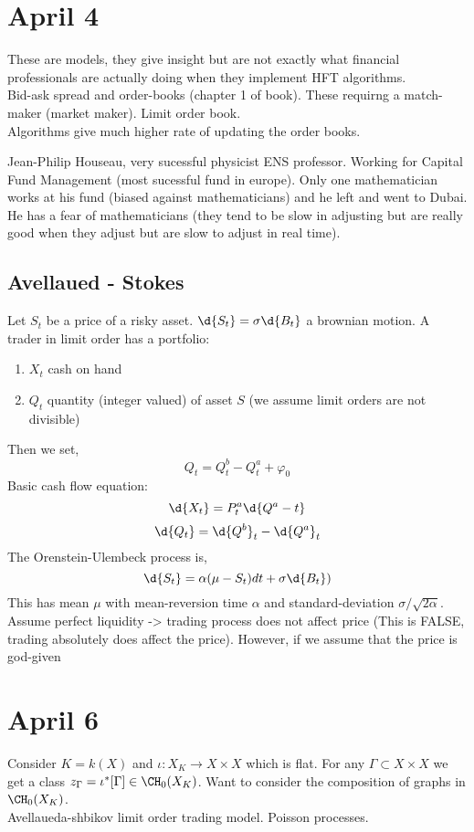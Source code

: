\documentclass[12pt]{article}
\begin{document}
\section{April 4}

These are models, they give insight but are not exactly what financial professionals are actually doing when they implement HFT algorithms.
\bigskip\\
Bid-ask spread and order-books (chapter 1 of book). These requirng a match-maker (market maker). Limit order book.
\bigskip\\
Algorithms give much higher rate of updating the order books.

Jean-Philip Houseau, very sucessful physicist ENS professor. Working for Capital Fund Management (most sucessful fund in europe). Only one mathematician works at his fund (biased against mathematicians) and he left and went to Dubai. He has a fear of mathematicians (they tend to be slow in adjusting but are really good when they adjust but are slow to adjust in real time).

\subsection{Avellaued - Stokes}

Let $S_t$ be a price of a risky asset. $\d{S_t} = \sigma \d{B_t}$ a brownian motion. A trader in limit order has a portfolio: 
\begin{enumerate}
\item $X_t$ cash on hand
\item $Q_t$ quantity (integer valued) of asset $S$ (we assume limit orders are not divisible)
\end{enumerate}

Then we set,
\[ Q_t = Q^b_t - Q^a_t + \varphi_0 \]
Basic cash flow equation:
\[ \d{X_t} = P^a_t \d{Q^a-t} \]
\[ \d{Q_t} = \d{Q^b}_t - \d{Q^a}_t \]
The Orenstein-Ulembeck process is,
\[ \d{S_t} = \alpha (\mu - S_t) d{t} + \sigma \d{B_t}) \]
This has mean $\mu$ with mean-reversion time $\alpha$ and standard-deviation $\sigma / \sqrt{2 \alpha}$. Assume perfect liquidity -> trading process does not affect price (This is FALSE, trading absolutely does affect the price). However, if we assume that the price is god-given 

\section{April 6}

Consider $K = k(X)$ and $\iota : X_K \to X \times X$ which is flat. For any $\Gamma \subset X \times X$ we get a class $z_\Gamma = \iota^* [\Gamma] \in \CH_0(X_K)$. Want to consider the composition of graphs in $\CH_0(X_K)$. 
\bigskip\\
Avellaueda-shbikov limit order trading model. Poisson processes. 
\end{document}
